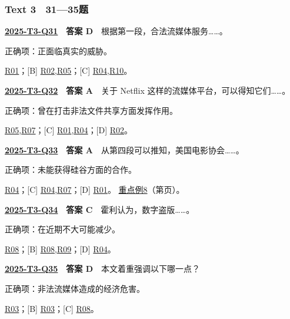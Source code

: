 \documentclass[11pt,a4paper]{article}
\begin{document}
\subsubsection{Text 3　31—35题}
\label{idx-2025-T3-Q31}
\noindent\textbf{\href{https://zj139.github.io/math-notes/english/c07bae9858bf4768714b07ae/\#q31}{2025-T3-Q31}　答案 D}　根据第一段，合法流媒体服务……。\par\nopagebreak
\noindent 正确项：正面临真实的威胁。\par\nopagebreak
\noindent [A] \hyperref[cat-R01]{R01}；[B] \hyperref[cat-R02]{R02},\hyperref[cat-R05]{R05}；[C] \hyperref[cat-R04]{R04},\hyperref[cat-R10]{R10}。
\par\smallskip
{}\label{idx-2025-T3-Q32}
\noindent\textbf{\href{https://zj139.github.io/math-notes/english/c07bae9858bf4768714b07ae/\#q32}{2025-T3-Q32}　答案 A}　关于 Netflix 这样的流媒体平台，可以得知它们……。\par\nopagebreak
\noindent 正确项：曾在打击非法文件共享方面发挥作用。\par\nopagebreak
\noindent [B] \hyperref[cat-R05]{R05},\hyperref[cat-R07]{R07}；[C] \hyperref[cat-R01]{R01},\hyperref[cat-R04]{R04}；[D] \hyperref[cat-R02]{R02}。
\par\smallskip
{}\label{idx-2025-T3-Q33}
\noindent\textbf{\href{https://zj139.github.io/math-notes/english/c07bae9858bf4768714b07ae/\#q33}{2025-T3-Q33}　答案 A}　从第四段可以推知，美国电影协会……。\par\nopagebreak
\noindent 正确项：未能获得硅谷方面的合作。\par\nopagebreak
\noindent [B] \hyperref[cat-R04]{R04}；[C] \hyperref[cat-R04]{R04},\hyperref[cat-R07]{R07}；[D] \hyperref[cat-R01]{R01}。
\hyperref[case-2025-T3-Q33]{重点例8}（第\pageref{case-2025-T3-Q33}页）。
\par\smallskip
{}\label{idx-2025-T3-Q34}
\noindent\textbf{\href{https://zj139.github.io/math-notes/english/c07bae9858bf4768714b07ae/\#q34}{2025-T3-Q34}　答案 C}　霍利认为，数字盗版……。\par\nopagebreak
\noindent 正确项：在近期不大可能减少。\par\nopagebreak
\noindent [A] \hyperref[cat-R08]{R08}；[B] \hyperref[cat-R08]{R08},\hyperref[cat-R09]{R09}；[D] \hyperref[cat-R04]{R04}。
\par\smallskip
{}\label{idx-2025-T3-Q35}
\noindent\textbf{\href{https://zj139.github.io/math-notes/english/c07bae9858bf4768714b07ae/\#q35}{2025-T3-Q35}　答案 D}　本文着重强调以下哪一点？\par\nopagebreak
\noindent 正确项：非法流媒体造成的经济危害。\par\nopagebreak
\noindent [A] \hyperref[cat-R03]{R03}；[B] \hyperref[cat-R03]{R03}；[C] \hyperref[cat-R08]{R08}。
\par\smallskip
\end{document}
